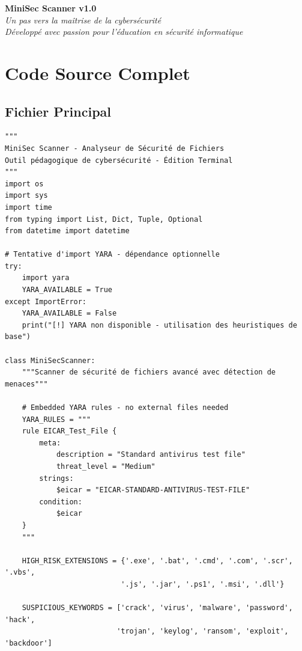 \documentclass[12pt,a4paper]{report}
\begin{document}
\begin{center}
\Large\textbf{MiniSec Scanner v1.0} \\
\normalsize\textit{Un pas vers la maîtrise de la cybersécurité} \\
\vspace{0.5cm}
\textit{Développé avec passion pour l'éducation en sécurité informatique}
\end{center}

\appendix

\chapter{Code Source Complet}

\section{Fichier Principal}

\begin{lstlisting}[caption={MiniSec_Scanner.py - Extrait}]
"""
MiniSec Scanner - Analyseur de Sécurité de Fichiers
Outil pédagogique de cybersécurité - Édition Terminal
"""
import os
import sys
import time
from typing import List, Dict, Tuple, Optional
from datetime import datetime

# Tentative d'import YARA - dépendance optionnelle
try:
    import yara
    YARA_AVAILABLE = True
except ImportError:
    YARA_AVAILABLE = False
    print("[!] YARA non disponible - utilisation des heuristiques de base")

class MiniSecScanner:
    """Scanner de sécurité de fichiers avancé avec détection de menaces"""
    
    # Embedded YARA rules - no external files needed
    YARA_RULES = """
    rule EICAR_Test_File {
        meta:
            description = "Standard antivirus test file"
            threat_level = "Medium"
        strings:
            $eicar = "EICAR-STANDARD-ANTIVIRUS-TEST-FILE"
        condition:
            $eicar
    }
    """
    
    HIGH_RISK_EXTENSIONS = {'.exe', '.bat', '.cmd', '.com', '.scr', '.vbs', 
                           '.js', '.jar', '.ps1', '.msi', '.dll'}
    
    SUSPICIOUS_KEYWORDS = ['crack', 'virus', 'malware', 'password', 'hack',
                          'trojan', 'keylog', 'ransom', 'exploit', 'backdoor']
\end{lstlisting}
\end{document}
